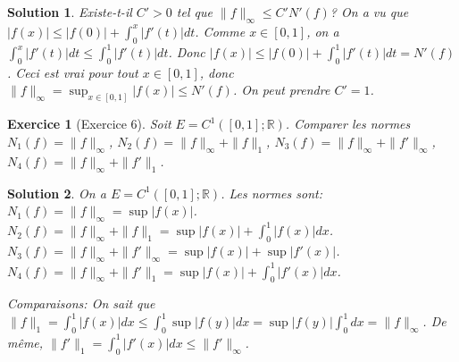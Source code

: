 \documentclass{article}
\newtheorem{solution}{Solution}
\newtheorem{exercise}{Exercice} %
\begin{document}
\begin{solution}
Existe-t-il $C'>0$ tel que $\|f\|_\infty \leq C' N'(f)$?
On a vu que $|f(x)| \leq |f(0)| + \int_0^x |f'(t)| dt$.
Comme $x \in [0,1]$, on a $\int_0^x |f'(t)| dt \leq \int_0^1 |f'(t)| dt$.
Donc $|f(x)| \leq |f(0)| + \int_0^1 |f'(t)| dt = N'(f)$.
Ceci est vrai pour tout $x \in [0,1]$, donc
$\|f\|_\infty = \sup_{x \in [0,1]} |f(x)| \leq N'(f)$.
On peut prendre $C'=1$.
\end{solution}

\begin{exercise}[Exercice 6]
Soit $E = C^1([0, 1]; \mathbb{R})$. Comparer les normes
$N_1(f) = \|f\|_\infty$, $N_2(f) = \|f\|_\infty + \|f\|_1$, $N_3(f) = \|f\|_\infty + \|f'\|_\infty$, $N_4(f) = \|f\|_\infty + \|f'\|_1$.
\end{exercise}

\begin{solution}
On a $E = C^1([0,1]; \mathbb{R})$.
Les normes sont:
$N_1(f) = \|f\|_\infty = \sup |f(x)|$.
$N_2(f) = \|f\|_\infty + \|f\|_1 = \sup |f(x)| + \int_0^1 |f(x)| dx$.
$N_3(f) = \|f\|_\infty + \|f'\|_\infty = \sup |f(x)| + \sup |f'(x)|$.
$N_4(f) = \|f\|_\infty + \|f'\|_1 = \sup |f(x)| + \int_0^1 |f'(x)| dx$.

Comparaisons:
On sait que $\|f\|_1 = \int_0^1 |f(x)| dx \leq \int_0^1 \sup |f(y)| dx = \sup |f(y)| \int_0^1 dx = \|f\|_\infty$.
De même, $\|f'\|_1 = \int_0^1 |f'(x)| dx \leq \|f'\|_\infty$.


\end{solution}
\end{document}
